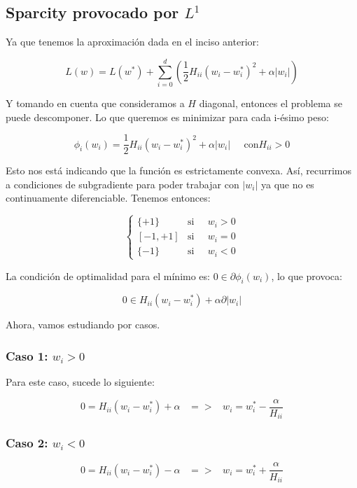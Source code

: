 \subsection{Sparcity provocado por $L^1$}

Ya que tenemos la aproximación dada en el inciso anterior:

\[
    L(w) = L(w^*) + \sum_{i=0}^{d} (\frac{1}{2} H_{ii} (w_i - w_i^*)^2 + \alpha |w_i|)
\]

Y tomando en cuenta que consideramos a $H$ diagonal, entonces el problema se puede descomponer. Lo 
que queremos es minimizar para cada i-ésimo peso:

\[
    \phi_i (w_i) = \frac{1}{2} H_{ii} (w_i - w_i^*)^2 + \alpha |w_i| \;\;\;\;\; \text{con} H_{ii}>0
\]  

Esto nos está indicando que la función es estrictamente convexa. Así, recurrimos a condiciones de 
subgradiente para poder trabajar con $|w_i|$ ya que no es continuamente diferenciable. Tenemos entonces:

\[
    \begin{cases}
        \{+1\} & \text{si} \;\;\;\;\; w_i > 0 \\
        [-1, +1] & \text{si} \;\;\;\;\; w_i = 0 \\
        \{-1\} & \text{si} \;\;\;\;\; w_i < 0 
    \end{cases}
\]

La condición de optimalidad para el mínimo es: $0 \in \partial \phi_i (w_i)$, lo que provoca:

\[
    0 \in H_{ii}(w_i - w_i^*) + \alpha \partial |w_i|
\]

Ahora, vamos estudiando por casos. 

\subsubsection*{\textbf{Caso 1:} $w_i > 0$}

Para este caso, sucede lo siguiente:

\[
    0 = H_{ii}(w_i - w_i^*) + \alpha \;\;\; => \;\;\; w_i = w_i^* - \frac{\alpha}{H_{ii}}
\]

\subsubsection*{\textbf{Caso 2:} $w_i < 0$}

\[
    0 = H_{ii}(w_i - w_i^*) - \alpha \;\;\; => \;\;\; w_i = w_i^* + \frac{\alpha}{H_{ii}}
\]

